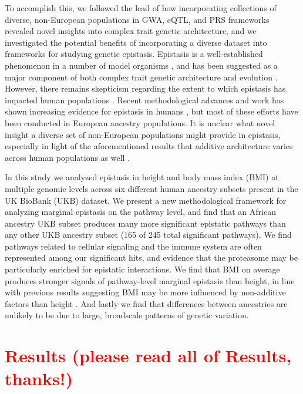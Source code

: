 \documentclass[12pt,a4paper]{article}
\begin{document}
To accomplish this, we followed the lead of how incorporating collections of diverse, non-European populations in GWA, eQTL, and PRS frameworks revealed novel insights into complex trait genetic architecture, and we investigated the potential benefits of incorporating a diverse dataset into frameworks for studying genetic epistasis. Epistasis is a well-established phenomenon in a number of model organisms \citep{Lehner2006,Rowe2008,Shao2008,Flint2009,Costanzo2010,He2010,Jarvis2011,Pettersson2011,Bloom2013,Monnahan2015}, and has been suggested as a major component of both complex trait genetic architecture and evolution \citep{Carlborg2004,Carlborg2006,Martin2007,Phillips2008,Moore2009,Jones2014,Mackay2014}. However, there remains skepticism regarding the extent to which epistasis has impacted human populations \citep{Hill2008,Crow2010,Aschard2012,Wood2014,Yang2015}. Recent methodological advances and work has shown increasing evidence for epistasis in humans \citep{Verma2016,Crawford2017a,Fang2019,Runcie2019}, but most of these efforts have been conducted in European ancestry populations. It is unclear what novel insight a diverse set of non-European populations might provide in epistasis, especially in light of the aforementioned results that additive architecture varies across human populations as well \citep{Dumitrescu2011,Carlson2013,Kuchenbaecker2019,Wojcik2019}.

In this study we analyzed epistasis in height and body mass index (BMI) at multiple genomic levels across six different human ancestry subsets present in the UK BioBank (UKB) \citep{Sudlow2015} dataset. We present a new methodological framework for analyzing marginal epistasis on the pathway level, and find that an African ancestry UKB subset produces many more significant epistatic pathways than any other UKB ancestry subset (165 of 245 total significant pathways). We find pathways related to cellular signaling and the immune system are often represented among our significant hits, and evidence that the proteasome may be particularly enriched for epistatic interactions. We find that BMI on average produces stronger signals of pathway-level marginal epistasis than height, in line with previous results suggesting BMI may be more influenced by non-additive factors than height \citep{Elks2012,Visscher2012}. And lastly we find that differences between ancestries are unlikely to be due to large, broadscale patterns of genetic variation.    


\section{\textcolor{red}{Results (please read all of Results, thanks!)}}\label{InterPath-Results}
\end{document}
